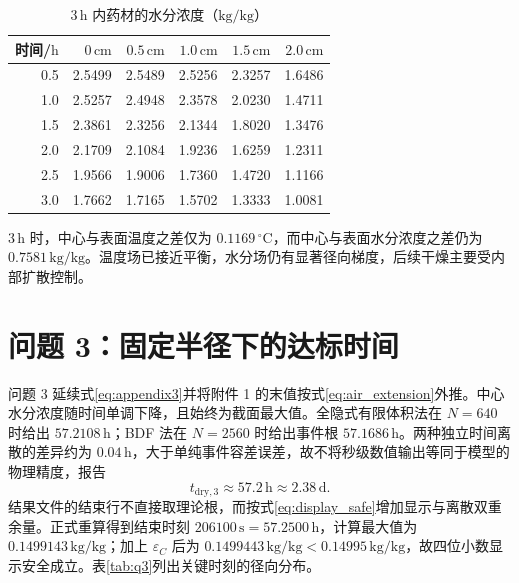\documentclass[UTF8,a4paper,zihao=-4,fontset=fandol]{ctexart}
\newcommand{\unit}[1]{\,\mathrm{#1}}
\begin{document}
\begin{table}[H]
\centering
\caption{$3\unit{h}$ 内药材的水分浓度（$\mathrm{kg/kg}$）}
\label{tab:q2moisture}
\small
\begin{tabular}{rrrrrr}
\toprule
时间/$\mathrm{h}$ & $0\unit{cm}$ & $0.5\unit{cm}$ & $1.0\unit{cm}$ & $1.5\unit{cm}$ & $2.0\unit{cm}$ \\
\midrule
0.5 & 2.5499 & 2.5489 & 2.5256 & 2.3257 & 1.6486 \\
1.0 & 2.5257 & 2.4948 & 2.3578 & 2.0230 & 1.4711 \\
1.5 & 2.3861 & 2.3256 & 2.1344 & 1.8020 & 1.3476 \\
2.0 & 2.1709 & 2.1084 & 1.9236 & 1.6259 & 1.2311 \\
2.5 & 1.9566 & 1.9006 & 1.7360 & 1.4720 & 1.1166 \\
3.0 & 1.7662 & 1.7165 & 1.5702 & 1.3333 & 1.0081 \\
\bottomrule
\end{tabular}
\end{table}

$3\unit{h}$ 时，中心与表面温度之差仅为 $0.1169\,^{\circ}\mathrm{C}$，而中心与表面水分浓度之差仍为 $0.7581\unit{kg/kg}$。温度场已接近平衡，水分场仍有显著径向梯度，后续干燥主要受内部扩散控制。


\section{问题 3：固定半径下的达标时间}

问题 3 延续式\eqref{eq:appendix3}并将附件 1 的末值按式\eqref{eq:air_extension}外推。中心水分浓度随时间单调下降，且始终为截面最大值。全隐式有限体积法在 $N=640$ 时给出 $57.2108\unit{h}$；BDF 法在 $N=2560$ 时给出事件根 $57.1686\unit{h}$。两种独立时间离散的差异约为 $0.04\unit{h}$，大于单纯事件容差误差，故不将秒级数值输出等同于模型的物理精度，报告
\begin{equation}
t_{\mathrm{dry},3}\approx57.2\unit{h}\approx2.38\unit{d}.
\end{equation}
结果文件的结束行不直接取理论根，而按式\eqref{eq:display_safe}增加显示与离散双重余量。正式重算得到结束时刻 $206100\unit{s}=57.2500\unit{h}$，计算最大值为 $0.1499143\unit{kg/kg}$；加上 $\varepsilon_C$ 后为 $0.1499443\unit{kg/kg}<0.14995\unit{kg/kg}$，故四位小数显示安全成立。表\ref{tab:q3}列出关键时刻的径向分布。
\end{document}
